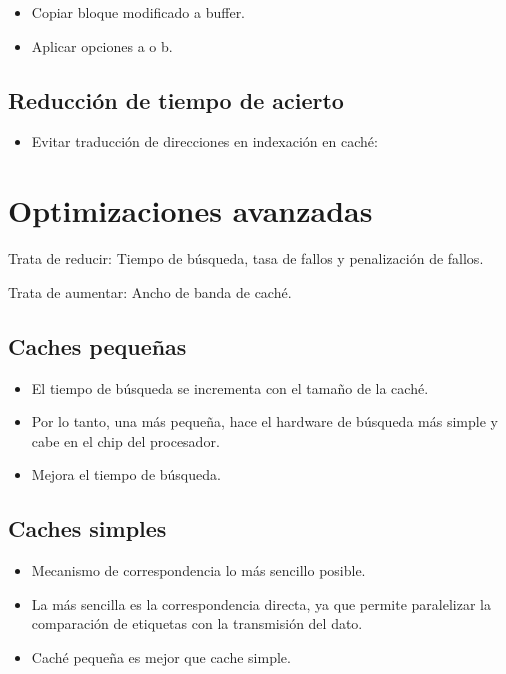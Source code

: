 \documentclass[12pt, twoside, openright]{report} %
\begin{document}
\begin{itemize}
\begin{itemize}
      \begin{itemize}
      
      \item
        Copiar bloque modificado a buffer.
      \item
        Aplicar opciones a o b.
      \end{itemize}
    \end{itemize}
  \end{itemize}

 \subsection{Reducción de tiempo de acierto}

  \begin{itemize}
  
  \item
    Evitar traducción de direcciones en indexación en caché:
  \end{itemize}

  \section{Optimizaciones avanzadas}

    Trata de reducir: Tiempo de búsqueda, tasa de fallos y penalización
    de fallos.

    Trata de aumentar: Ancho de banda de caché.

   \subsection{Caches pequeñas}

    \begin{itemize}
    
    \item
      El tiempo de búsqueda se incrementa con el tamaño de la caché.
    \item
      Por lo tanto, una más pequeña, hace el hardware de búsqueda más
      simple y cabe en el chip del procesador.
    \item
      Mejora el tiempo de búsqueda.
    \end{itemize}

    \subsection{Caches simples}

    \begin{itemize}
    
    \item
      Mecanismo de correspondencia lo más sencillo posible.
    \item
      La más sencilla es la correspondencia directa, ya que permite
      paralelizar la comparación de etiquetas con la transmisión del
      dato.
    \item
      Caché pequeña es mejor que cache simple.
    \end{itemize}
\end{document}
